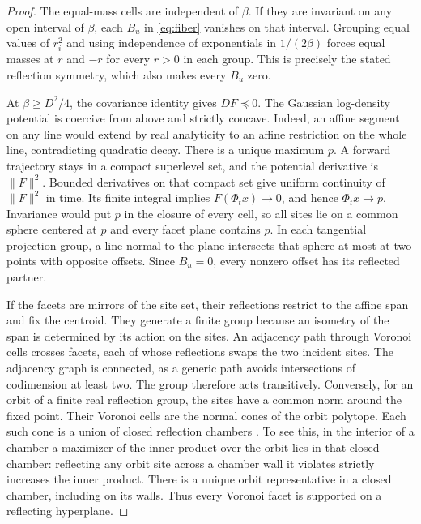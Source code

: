 \begin{proof}
The equal-mass cells are independent of $\beta$. If they are invariant
on any open interval of $\beta$, each $B_u$ in \eqref{eq:fiber} vanishes
on that interval. Grouping equal values of $r_i^2$ and using independence
of exponentials in $1/(2\beta)$ forces equal masses at $r$ and $-r$
for every $r>0$ in each group. This is precisely the stated reflection
symmetry, which also makes every $B_u$ zero.

At $\beta\ge D^2/4$, the covariance identity gives $DF\preceq 0$.
The Gaussian log-density potential is coercive from above and strictly
concave. Indeed, an affine segment on any line would extend by real
analyticity to an affine restriction on the whole line, contradicting
quadratic decay. There is a unique maximum $p$. A forward trajectory
stays in a compact superlevel set, and the potential derivative is
$\lVert F\rVert^2$. Bounded derivatives on that compact set give uniform
continuity of $\lVert F\rVert^2$ in time. Its finite integral implies
$F(\Phi_t x)\to0$, and hence $\Phi_t x\to p$. Invariance would put $p$
in the closure of every cell, so all sites lie on a common sphere
centered at $p$ and every facet plane contains $p$. In each tangential
projection group, a line normal to the plane intersects that sphere
at most at two points with opposite offsets. Since $B_u=0$, every
nonzero offset has its reflected partner.

If the facets are mirrors of the site set, their reflections restrict
to the affine span and fix the centroid. They generate a finite group
because an isometry of the span is determined by its action on the
sites. An adjacency path through Voronoi cells crosses facets, each of
whose reflections swaps the two incident sites. The adjacency graph is
connected, as a generic path avoids intersections of codimension at
least two. The group therefore acts transitively. Conversely, for an
orbit of a finite real reflection group, the sites have a common norm
around the fixed point. Their Voronoi cells are the normal cones of
the orbit polytope. Each such cone is a union of closed reflection
chambers \cite{ardila}. To see this, in the interior of a chamber a
maximizer of the inner product over the orbit lies in that closed
chamber: reflecting any orbit site across a chamber wall it violates
strictly increases the inner product. There is a unique orbit
representative in a closed chamber, including on its walls.
Thus every Voronoi facet is supported on a reflecting hyperplane.
\end{proof}

